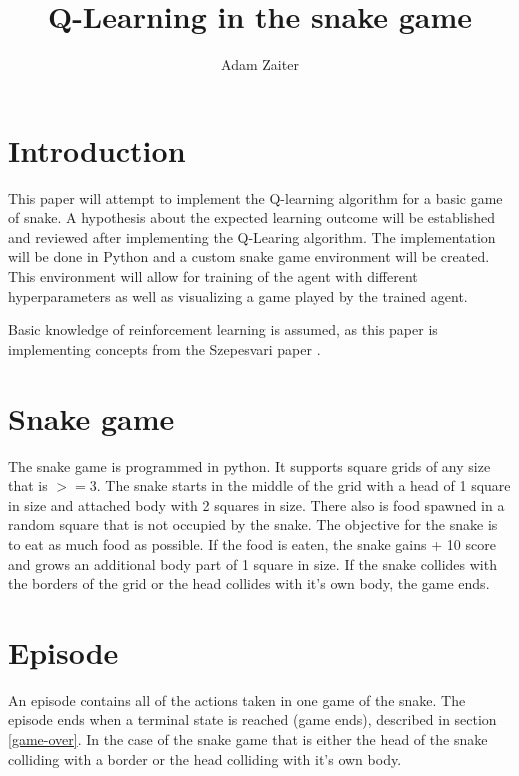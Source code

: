 \documentclass[lettersize,journal]{IEEEtran}
\begin{document}
\title{Q-Learning in the snake game}
\author{Adam Zaiter}

\maketitle

\begin{abstract}
\end{abstract}

\begin{IEEEkeywords}
\end{IEEEkeywords}


\section{Introduction}
This paper will attempt to implement the Q-learning algorithm
for a basic game of snake. A hypothesis about the expected learning
outcome will be established and reviewed after implementing the
Q-Learing algorithm. The implementation will be done in Python
and a custom snake game environment will be created.
This environment will allow for training of the agent with different
hyperparameters as well as visualizing a game played by the
trained agent.


Basic knowledge of reinforcement learning is assumed, as this paper
is implementing concepts from the Szepesvari paper \cite{szepesvari}.

\section{Snake game}
The snake game is programmed in python.
It supports square grids of any size that is $>= 3$.
The snake starts in the middle of the grid with a head of
1 square in size and attached
body with 2 squares in size. There also is food spawned in a random
square that is not occupied by the snake. The objective for the
snake is to eat as much food as possible. If the food is eaten,
the snake gains + 10 score and grows an additional body part of
1 square in size. If the snake collides with the borders of the grid
or the head collides with it's own body, the game ends.\label{game-over}

\section{Episode}
An episode contains all of the actions taken in one game
of the snake. The episode ends when a terminal state is
reached (game ends), described in section \ref{game-over}. In the case of the snake game that is either
the head of the snake colliding with a border or the head
colliding with it's own body.
\end{document}
